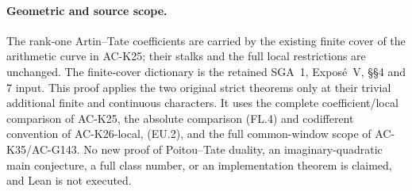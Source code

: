 \paragraph{Geometric and source scope.}
The rank-one Artin--Tate coefficients are carried by the existing
finite cover of the arithmetic curve in AC-K25; their stalks and
the full local restrictions are unchanged.  The finite-cover
dictionary is the retained SGA~1, Expos\'e~V, \S\S4 and 7 input.
This proof applies the two original strict theorems only at their
trivial additional finite and continuous characters.  It uses the
complete coefficient/local comparison of AC-K25, the absolute
comparison (FL.4) and codifferent convention of AC-K26-local,
(EU.2), and the full common-window scope of AC-K35/AC-G143.
No new proof of Poitou--Tate duality, an imaginary-quadratic main
conjecture, a full class number, or an implementation theorem is
claimed, and Lean is not executed.
